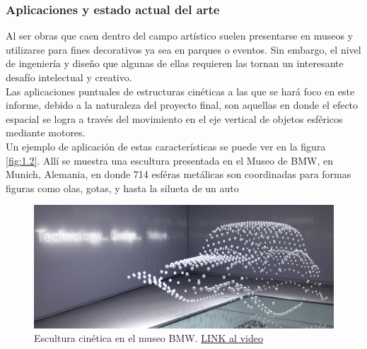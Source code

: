 \newpage
\subsubsection{Aplicaciones y estado actual del arte}
Al ser obras que caen dentro del campo artístico suelen presentarse en museos y utilizarse para fines decorativos ya sea en parques o eventos. Sin embargo, el nivel de ingeniería y diseño que algunas de ellas requieren las tornan un interesante desafío intelectual y creativo.\\


Las aplicaciones puntuales de estructuras cinéticas a las que se hará foco en este informe, debido a la naturaleza del proyecto final, son aquellas en donde el efecto espacial se logra a través del movimiento en el eje vertical de objetos esféricos mediante motores. \\

Un ejemplo de aplicación de estas características se puede ver en la figura \ref{fig:1.2}. Allí se muestra una escultura presentada en el Museo de BMW, en Munich, Alemania, en donde 714 esféras metálicas son coordinadas para formas figuras como olas, gotas, y hasta la silueta de un auto \\
\begin{figure}[!ht]
	\centering
	\includegraphics[width=15cm,scale=1]{resources/1_2-kinSculp.png}
	\caption{ Escultura cinética en el museo BMW. \href{https://www.youtube.com/watch?v=HVhVClFMg6Y}{LINK al video} }
	\label{fig:\thefigure}
\end{figure}

